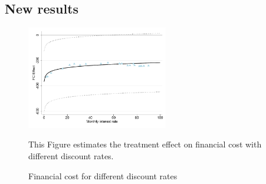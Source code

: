 \documentclass[oneside,11pt]{article}
\begin{document}
\subsection{New results}
\begin{figure}[H]
        \caption{Financial cost for different discount rates}
    \label{fc_discount_rates}
    \begin{center}
        \centering
        \includegraphics[width=0.55\textwidth]{Figuras/discount_effect.pdf}
    \end{center}
     \scriptsize This Figure estimates the treatment effect on financial cost with different discount rates.  
\end{figure}
\end{document}
